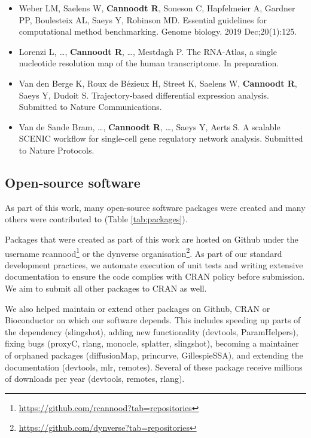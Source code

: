 \begin{itemize}
	\item Weber LM, Saelens W, \textbf{Cannoodt R}, Soneson C, Hapfelmeier A, Gardner PP, Boulesteix AL, Saeys Y, Robinson MD. Essential guidelines for computational method benchmarking. Genome biology. 2019 Dec;20(1):125.
	\item Lorenzi L, \ldots, \textbf{Cannoodt R}, \ldots, Mestdagh P. The RNA-Atlas, a single nucleotide resolution map of the human transcriptome. In preparation.
	\item Van den Berge K, Roux de Bézieux H, Street K, Saelens W, \textbf{Cannoodt R}, Saeys Y, Dudoit S. Trajectory-based differential expression analysis. Submitted to Nature Communications.
	\item Van de Sande Bram, \ldots, \textbf{Cannoodt R}, \ldots, Saeys Y, Aerts S. A scalable SCENIC workflow for single-cell gene regulatory network analysis. Submitted to Nature Protocols.
\end{itemize}

\subsection{Open-source software}
As part of this work, many open-source software packages were created and many others were contributed to (Table \ref{tab:packages}). 

Packages that were created as part of this work are hosted on Github under the username rcannood\footnote{\url{https://github.com/rcannood?tab=repositories}} or the dynverse organisation\footnote{\url{https://github.com/dynverse?tab=repositories}}. As part of our standard development practices, we automate execution of unit tests and writing extensive documentation to ensure the code complies with CRAN policy before submission. We aim to submit all other packages to CRAN as well.

We also helped maintain or extend other packages on Github, CRAN or Bioconductor on which our software depends. This includes speeding up parts of the dependency (slingshot), adding new functionality (devtools, ParamHelpers), fixing bugs (proxyC, rlang, monocle, splatter, slingshot), becoming a maintainer of orphaned packages (diffusionMap, princurve, GillespieSSA), and extending the documentation (devtools, mlr, remotes). Several of these package receive millions of downloads per year (devtools, remotes, rlang).

\newcommand{\cranpkg}[1]{\href{https://cran.r-project.org/package=#1}{#1}}
\newcommand{\biocpkg}[1]{\href{https://bioconductor.org/packages/#1}{#1}}
\newcommand{\biocpkgl}[2]{\href{https://bioconductor.org/packages/#1}{#2}}
\newcommand{\githubpkg}[2]{\href{https://github.com/#1/#2}{#2}}
\newcommand{\notavailable}{}

